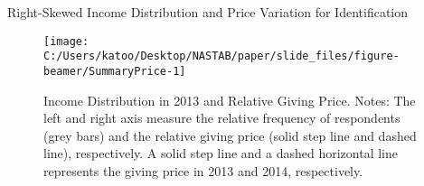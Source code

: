 \documentclass[
  ignorenonframetext,
  aspectratio=169,
]{beamer}
\begin{document}
\begin{frame}{Right-Skewed Income Distribution and Price Variation for Identification}
\protect\hypertarget{right-skewed-income-distribution-and-price-variation-for-identification}{}
\begin{figure}[t]

{\centering \texttt{[image: C:/Users/katoo/Desktop/NASTAB/paper/slide\_files/figure-beamer/SummaryPrice-1]} 

}

\caption{Income Distribution in 2013 and Relative Giving Price. Notes: The left and right axis measure the relative frequency of respondents (grey bars) and the relative giving price (solid step line and dashed line), respectively. A solid step line and a dashed horizontal line represents the giving price in 2013 and 2014, respectively.}\label{fig:SummaryPrice}
\end{figure}
\end{frame}
\end{document}
